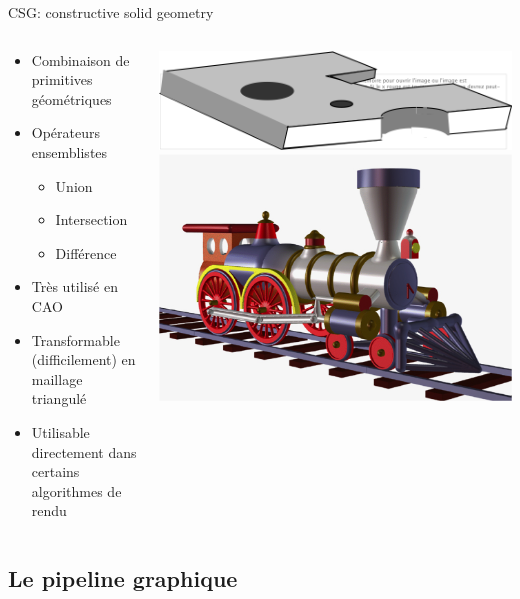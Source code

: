 \begin{frame}{CSG: constructive solid geometry}
\begin{columns}
\begin{column}{.6\textwidth}
\begin{itemize}
\item Combinaison de primitives géométriques
\item Opérateurs ensemblistes
\begin{itemize}
\item Union
\item Intersection
\item Différence
\end{itemize}
\item Très utilisé en CAO
\item Transformable (difficilement) en maillage triangulé
\item Utilisable directement dans certains algorithmes de rendu
\end{itemize}
\end{column}
\begin{column}{.39\textwidth}
\includegraphics[width=.8\textwidth]{figs/csg1.png} \\
\vspace{1cm}
\includegraphics[width=.8\textwidth]{figs/csg2.png}
\end{column}
\end{columns}
\end{frame}

\subsection{Le pipeline graphique}

